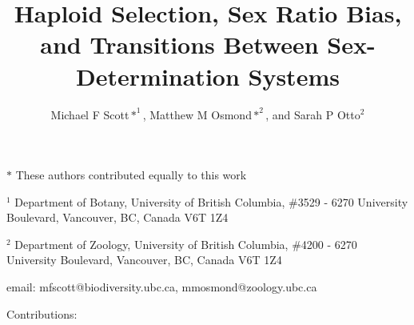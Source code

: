 \documentclass[12pt]{article}
\begin{document}
\title{Haploid Selection, Sex Ratio Bias, and Transitions Between Sex-Determination Systems}
\author{Michael F Scott$*^1$, Matthew M Osmond$*^2$, and Sarah P Otto$^2$}
\date{}
\maketitle
\noindent
$*$ These authors contributed equally to this work

\noindent
$^1$ Department of Botany, University of British Columbia, \#3529 - 6270 University Boulevard, Vancouver, BC, Canada V6T 1Z4

\noindent
$^2$ Department of Zoology, University of British Columbia, \#4200 - 6270 University Boulevard, Vancouver, BC, Canada V6T 1Z4

\noindent
email: mfscott@biodiversity.ubc.ca, mmosmond@zoology.ubc.ca

\noindent
Contributions: 

\newpage
\linenumbers
\modulolinenumbers[2]
\end{document}
